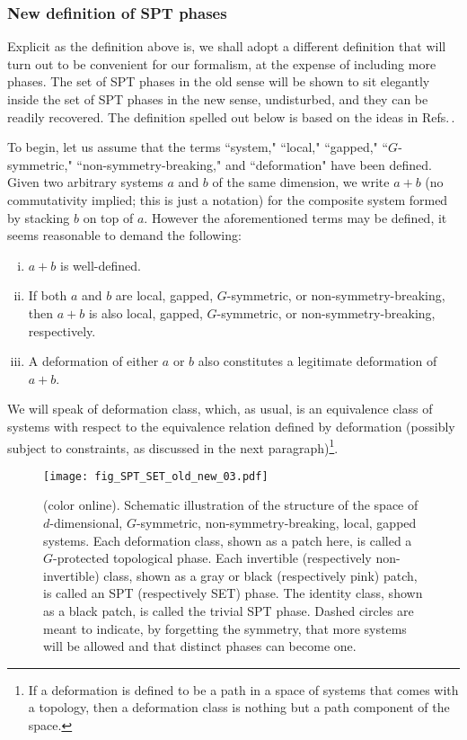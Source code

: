 \documentclass[sort&compress]{elsarticle}
\theoremstyle{theoremstyle}
\theoremstyle{framedtheoremstyle}
\theoremstyle{definitionstyle}
\theoremstyle{definitionstyle}
\theoremstyle{definitionstyle}
\theoremstyle{definitionstyle}
\theoremstyle{nameddefinitionstyle}
\theoremstyle{framednameddefinitionstyle}
\theoremstyle{proofstyle}
\theoremstyle{definitionstyle}
\begin{document}
\subsubsection{New definition of SPT phases\label{subsubsec:new_definition_SPT_phases}}

Explicit as the definition above is, we shall adopt a different definition that will turn out to be %
convenient for our formalism, at the expense of including more phases. The set of SPT phases in the old sense will be shown to sit elegantly inside the set of SPT phases in the new sense, undisturbed, and they can be readily recovered. The definition spelled out below is based on the ideas in Refs.\,\cite{FreedMoore2006, Kitaev_Stony_Brook_2011_SRE_2, Kitaev_Stony_Brook_2013_SRE, Kapustin_Boson, Freed_SRE_iTQFT, Freed_ReflectionPositivity, McGreevy_sSourcery}.

To begin, let us assume that the terms ``system," ``local," ``gapped," ``$G$-symmetric," ``non-symmetry-breaking," and ``deformation" have been defined. Given two arbitrary systems $a$ and $b$ of the same dimension, we write $a+b$ (no commutativity implied; this is just a notation) for the composite system formed by stacking $b$ on top of $a$. However the aforementioned terms may be defined, it seems reasonable to demand the following:
\begin{enumerate}[(i)]
\item $a+b$ is well-defined.

\item If both $a$ and $b$ are local, gapped, $G$-symmetric, or non-symmetry-breaking, then $a+b$ is also local, gapped, $G$-symmetric, or non-symmetry-breaking, respectively.

\item A deformation of either $a$ or $b$ also constitutes a legitimate deformation of $a+b$.
\end{enumerate}
We will speak of deformation class, which, as usual, is an equivalence class of systems with respect to the equivalence relation defined by deformation (possibly subject to constraints, as discussed in the next paragraph)\footnote{If a deformation is defined to be a path in a space of systems that comes with a topology, then a deformation class is nothing but a path component of the space.}.

\begin{figure}[t]
\centering
\texttt{[image: fig\_SPT\_SET\_old\_new\_03.pdf]}
\caption{(color online). Schematic illustration of the structure of the space of $d$-dimensional, $G$-symmetric, non-symmetry-breaking, local, gapped systems. Each deformation class, shown as a patch here, is called a $G$-protected topological phase. Each invertible (respectively non-invertible) class, shown as a gray or black (respectively pink) patch, is called an SPT (respectively SET) phase. The identity class, shown as a black patch, is called the trivial SPT phase.
Dashed circles are meant to indicate, by forgetting the symmetry, that more systems will be allowed and that distinct phases can become one.}
\label{fig:SPT_SET_old_new}
\end{figure}
\end{document}
